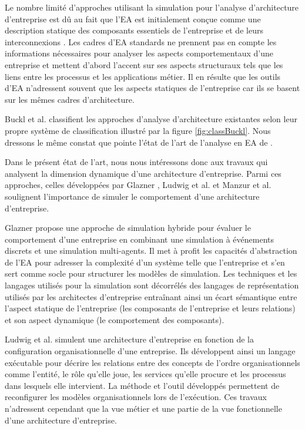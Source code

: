 Le nombre limité d'approches utilisant la simulation pour l'analyse
d'architecture d'entreprise est dû au fait que l'EA est initialement conçue
comme une description statique des composants essentiels de l'entreprise et de
leurs interconnexions \cite{hoffman2013enterprise}. Les cadres d'EA standards
ne prennent pas en compte les informations nécessaires pour analyser les
aspects comportementaux d'une entreprise et mettent d'abord l'accent sur ses
aspects structuraux tels que les liens entre les processus et les applications
métier. Il en résulte que les outils d'EA n'adressent souvent que les aspects
statiques de l'entreprise car ils se basent sur les mêmes cadres d'architecture.

Buckl et al. \cite{buckl2009classifying} classifient les approches d'analyse d'architecture existantes selon leur propre système de classification illustré par la figure \ref{fig:classBuckl}. Nous dressons le même constat que pointe l'état de l'art de l'analyse en EA de \cite{manzur2015xarchimate}. 

Dans le présent état de l'art, nous nous intéressons donc aux travaux qui analysent la
dimension dynamique d'une architecture d'entreprise. Parmi ces approches,
celles développées par Glazner \cite{glazner2011enterprise},
Ludwig et al. \cite{ludwig2011organizational} et Manzur et al. \cite{manzur2015xarchimate} soulignent
l'importance de simuler le comportement d'une architecture d'entreprise. 

Glazner \cite{glazner2011enterprise} propose une approche de simulation hybride pour
évaluer le comportement d'une entreprise en combinant une simulation à
événements discrets et une simulation multi-agents.
Il met à profit les capacités d'abstraction de l'EA pour adresser la complexité d'un système telle que l'entreprise et s'en sert
comme socle pour structurer les modèles de simulation. Les
techniques et les langages utilisés pour la simulation sont décorrélés des
langages de représentation utilisés par les architectes d'entreprise entraînant
ainsi un écart sémantique entre l'aspect statique de l'entreprise (les composants
de l'entreprise et leurs relations) et son aspect dynamique (le comportement
des composants). 

Ludwig et al. \cite{ludwig2011organizational} simulent une architecture d'entreprise en
fonction de la configuration organisationnelle d'une entreprise. Ils
développent ainsi un langage exécutable pour décrire les relations entre des
concepts de l'ordre organisationnels comme l'entité, le rôle
qu'elle joue, les services qu'elle procure et les processus dans lesquels elle
intervient. La méthode et l'outil développés permettent de reconfigurer les
modèles organisationnels lors de l'exécution. Ces travaux n'adressent cependant
que la vue métier et une partie de la vue fonctionnelle d'une architecture
d'entreprise.

